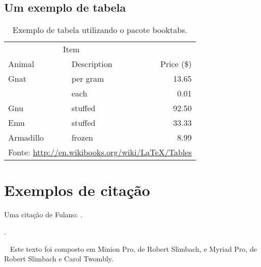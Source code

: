 \documentclass[11pt,a5paper]{memoir}
\begin{document}
\section{Um exemplo de tabela}
\begin{table}
\caption{Exemplo de tabela utilizando o pacote \textsf{booktabs}.}
\begin{tabular}{llr}
\toprule
\multicolumn{2}{c}{Item} \\
\cmidrule(r){1-2}
Animal    & Description & Price (\$) \\
\midrule
Gnat      & per gram    & 13.65      \\
          & each        & 0.01       \\
Gnu       & stuffed     & 92.50      \\
Emu       & stuffed     & 33.33      \\
Armadillo & frozen      & 8.99       \\
\bottomrule
\multicolumn{3}{l}{\footnotesize Fonte: \url{http://en.wikibooks.org/wiki/LaTeX/Tables}}
\end{tabular}
\end{table}

\chapter{Exemplos de citação}

Uma citação de Fulano: .

\cite{fulano}.



\backmatter %
\cleardoublepage
\thispagestyle{empty} %
~\vfill
Este texto foi composto em Minion Pro, de Robert Slimbach, e Myriad Pro, de Robert Slimbach e Carol Twombly.
\end{document}
